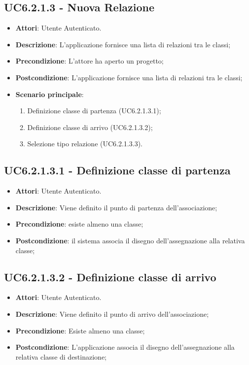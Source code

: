 \subsection{UC6.2.1.3 - Nuova Relazione} 
\label{ssec:UC6.2.1.3} 
\begin{itemize} 
\item \textbf{Attori}: Utente Autenticato.
\item \textbf{Descrizione}: L'applicazione fornisce una lista di relazioni tra le classi;
\item \textbf{Precondizione}: L'attore ha aperto un progetto;
\item \textbf{Postcondizione}: L'applicazione fornisce una lista di relazioni tra le classi;
\item \textbf{Scenario principale}: \begin{enumerate}\item Definizione classe di partenza (UC6.2.1.3.1);\item Definizione classe di arrivo (UC6.2.1.3.2);\item Selezione tipo relazione (UC6.2.1.3.3). 
 \end{enumerate}
\end{itemize} 
\subsection{UC6.2.1.3.1 - Definizione classe di partenza} 
\label{ssec:UC6.2.1.3.1} 
\begin{itemize} 
\item \textbf{Attori}: Utente Autenticato.
\item \textbf{Descrizione}: Viene definito il punto di partenza dell'associazione;
\item \textbf{Precondizione}: esiste almeno una classe;
\item \textbf{Postcondizione}: il sistema associa il disegno dell'assegnazione alla relativa classe;
\end{itemize} 
\subsection{UC6.2.1.3.2 - Definizione classe di arrivo} 
\label{ssec:UC6.2.1.3.2} 
\begin{itemize} 
\item \textbf{Attori}: Utente Autenticato.
\item \textbf{Descrizione}: Viene definito il punto di arrivo dell'associazione;
\item \textbf{Precondizione}: Esiste almeno una classe;
\item \textbf{Postcondizione}: L'applicazione associa il disegno dell'assegnazione alla relativa classe di destinazione;
\end{itemize} 
